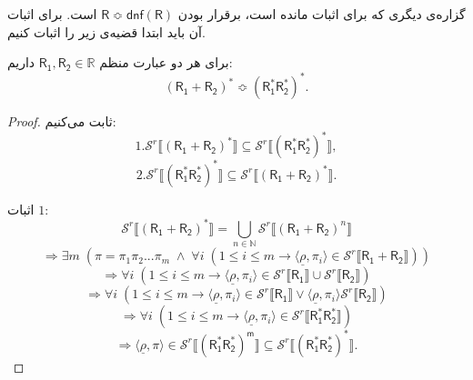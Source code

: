 گزاره‌ی دیگری که برای اثبات مانده است، برقرار بودن 
$\mathsf{R \Bumpeq dnf(R) }$
است. برای اثبات آن باید ابتدا قضیه‌ی زیر را اثبات کنیم.
\begin{thm}
	برای هر دو عبارت منظم 
	$\mathsf{R_1 , R_2} \in \mathbb{R}$
	داریم:
	$$\mathsf{(R_1 + R_2)^* \Bumpeq (R_1^* R_2^*)^*}.$$
\end{thm} 
\begin{proof}
	ثابت می‌کنیم:
	$$1.\mathcal{S}^r \llbracket \mathsf{(R_1 + R_2)}^* \rrbracket \subseteq \mathcal{S}^r \llbracket \mathsf{(R_1^* R_2^*)}^* \rrbracket,$$
	$$2.\mathcal{S}^r \llbracket \mathsf{(R_1^* R_2^*)}^* \rrbracket \subseteq \mathcal{S}^r \llbracket  \mathsf{(R_1 + R_2)}^*\rrbracket.$$ 
	
	اثبات $1$:
	$$\mathcal{S}^r \llbracket \mathsf{(R_1 + R_2)}^* \rrbracket = \bigcup_{n\in\mathbb{N}}
	\mathcal{S}^r \llbracket\mathsf{(R_1 + R_2)}^n \rrbracket
	$$
	$$\Rightarrow \exists m\; (\pi=\pi_1\pi_2...\pi_m \;\land\;\forall i \; (1\leq i \leq m \rightarrow \langle\underline{\rho},\pi_i \rangle \in \mathcal{S}^r \llbracket \mathsf{R_1+R_2}\rrbracket))$$
	$$\Rightarrow\forall i \; (1\leq i \leq m \rightarrow \langle\underline{\rho},\pi_i  \rangle \in \mathcal{S}^r \llbracket \mathsf{R_1}\rrbracket \cup \mathcal{S}^r \llbracket \mathsf{R_2}\rrbracket)$$
	$$\Rightarrow\forall i \; (1\leq i \leq m \rightarrow \langle\underline{\rho},\pi_i  \rangle \in \mathcal{S}^r \llbracket \mathsf{R_1}\rrbracket \lor \langle\underline{\rho},\pi_i  \rangle \mathcal{S}^r \llbracket \mathsf{R_2}\rrbracket)$$
	$$\Rightarrow\forall i \; (1\leq i \leq m \rightarrow \langle\underline{\rho},\pi_i  \rangle \in \mathcal{S}^r \llbracket \mathsf{R_1^* R_2^*}\rrbracket)$$
	$$\Rightarrow\langle\underline{\rho},\pi  \rangle \in \mathcal{S}^r \llbracket \mathsf{(R_1^* R_2^*)^m}\rrbracket \subseteq \mathcal{S}^r \llbracket \mathsf{(R_1^* R_2^*)^*}\rrbracket.$$
	

\end{proof}
